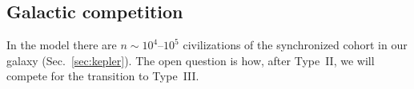 \documentclass[11pt,a4paper]{article}
\begin{document}
\subsection{Galactic competition}
\label{sec:galactic_competition}

In the model there are $n \sim 10^4$--$10^5$ civilizations of the synchronized cohort in our galaxy (Sec.~\ref{sec:kepler}). The open question is how, after Type~II, we will compete for the transition to Type~III.



\end{document}

